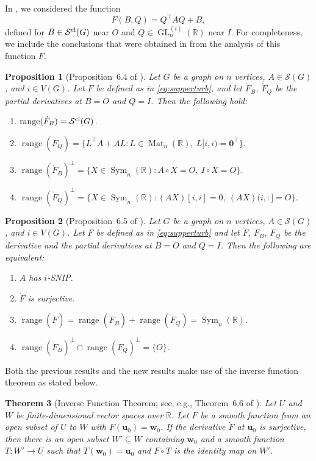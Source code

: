 \documentclass{article}
\newtheorem{theorem}{Theorem}[section]
\newtheorem{proposition}[theorem]{Proposition}
\theoremstyle{definition}
\newcommand{\trans}{^\top}
\newcommand{\bzero}{\mathbf{0}}
\newcommand{\bu}{\mathbf{u}}
\newcommand{\bw}{\mathbf{w}}
\newcommand{\range}{\operatorname{range}}
\newcommand{\mptn}{\mathcal{S}} %
\newcommand{\mptncl}{\mathcal{S}^{\rm cl}}
\newcommand{\GL}[2][n]{\operatorname{GL}^{(#2)}_{#1}(\mathbb{R})}
\newcommand{\mat}[1][n]{\operatorname{Mat}_{#1}(\mathbb{R})}
\newcommand{\msym}[1][n]{\operatorname{Sym}_{#1}(\mathbb{R})}
\begin{document}
In \cite{SNIP}, we considered the function  
\begin{equation}
\label{eq:supperturb}
    F(B,Q) = Q\trans AQ + B,
\end{equation}
defined for $B\in\mptncl(G)$ near $O$ and $Q\in\GL{i}$ near $I$.
For completeness, we include the conclusions that were obtained in \cite{SNIP} from the analysis of this function $F$.

\begin{proposition}[Proposition~6.4 of \cite{SNIP}]
\label{prop:snipspaces}
Let $G$ be a graph on $n$ vertices, $A\in\mptn(G)$, and $i\in V(G)$. Let $F$ be defined as in \cref{eq:supperturb},  and let $\dot{F}_B$, $\dot{F}_Q$ be the partial derivatives at $B = O$ and $Q = I$.  Then the following hold:
\begin{enumerate}[label={{\rm(\alph*)}}]
\item $\range(\dot{F}_B) = \mptncl(G)$.
\item $\range(\dot{F}_Q) = \{L\trans A + AL: L\in\mat,\ L[i,i) = \bzero\trans\}$.
\item $\range(\dot{F}_B)^\perp = \{X\in\msym: A\circ X = O,\ I\circ X = O\}$.
\item $\range(\dot{F}_Q)^\perp = \{X\in\msym: (AX)[i,i] = 0,\ (AX)(i,:] = O\}$.
\end{enumerate}
\end{proposition}

\begin{proposition}[Proposition~6.5 of \cite{SNIP}]
\label{prop:snipequiv}
Let $G$ be a graph on $n$ vertices, $A\in\mptn(G)$, and $i\in V(G)$.  Let $F$ be defined as in \cref{eq:supperturb} and let $\dot{F}$, $\dot{F}_B$, $\dot{F}_Q$ be the derivative and the partial derivatives at $B = O$ and $Q = I$.  Then the following are equivalent:
\begin{enumerate}[label={{\rm(\alph*)}}]
\item $A$ has $i$-SNIP.
\item $\dot{F}$ is surjective.
\item $\range(\dot{F}) = \range(\dot{F}_B) + \range(\dot{F}_Q) = \msym$.
\item $\range(\dot{F}_B)^\perp \cap \range(\dot{F}_Q)^\perp = \{O\}$.
\end{enumerate}
\end{proposition}

Both the previous results and the new results make use of the inverse function theorem as stated below.

\begin{theorem}[Inverse Function Theorem; see, e.g., Theorem~6.6 of \cite{SNIP}]
\label{thm:invftsur}
Let $U$ and $W$ be finite-dimensional vector spaces over $\mathbb{R}$. Let $F$ be a smooth function from an open subset of $U$ to $W$ with $F(\bu_0) = \bw_0$. If the derivative $\dot{F}$ at $\bu_0$ is surjective, then there is an open subset $W'\subseteq W$ containing $\bw_0$ and a smooth function $T:W'\rightarrow U$ such that $T(\bw_0) = \bu_0$ and $F\circ T$ is the identity map on $W'$. 
\end{theorem}
\end{document}
